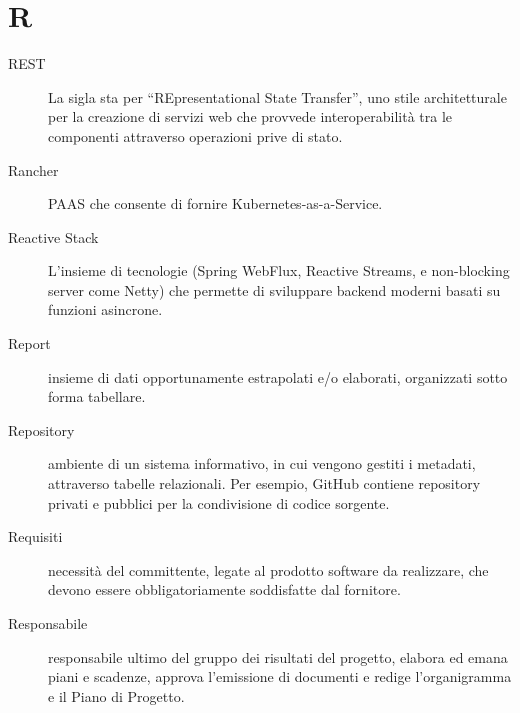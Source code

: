 \documentclass{article}
\begin{document}
\section{R}
\begin{description}
  \item[REST] La sigla sta per ``REpresentational State Transfer''\@, uno stile architetturale per la creazione di servizi web che provvede interoperabilità tra le componenti attraverso operazioni prive di stato.
  \item[Rancher] PAAS che consente di fornire Kubernetes-as-a-Service.
  \item[Reactive Stack] L'insieme di tecnologie (Spring WebFlux, Reactive Streams, e non-blocking server come Netty) che permette di sviluppare backend moderni basati su funzioni asincrone.
  \item[Report] insieme di dati opportunamente estrapolati e/o elaborati, organizzati sotto forma tabellare.
  \item[Repository] ambiente di un sistema informativo, in cui vengono gestiti i metadati, attraverso tabelle relazionali. Per esempio, GitHub contiene repository privati e pubblici per la condivisione di codice sorgente.
  \item[Requisiti] necessità del committente, legate al prodotto software da realizzare, che devono essere obbligatoriamente soddisfatte dal fornitore.
  \item[Responsabile] responsabile ultimo del gruppo dei risultati del progetto, elabora ed emana piani e scadenze, approva l'emissione di documenti e redige l'organigramma e il Piano di Progetto.
\end{description}
\newpage
\end{document}
